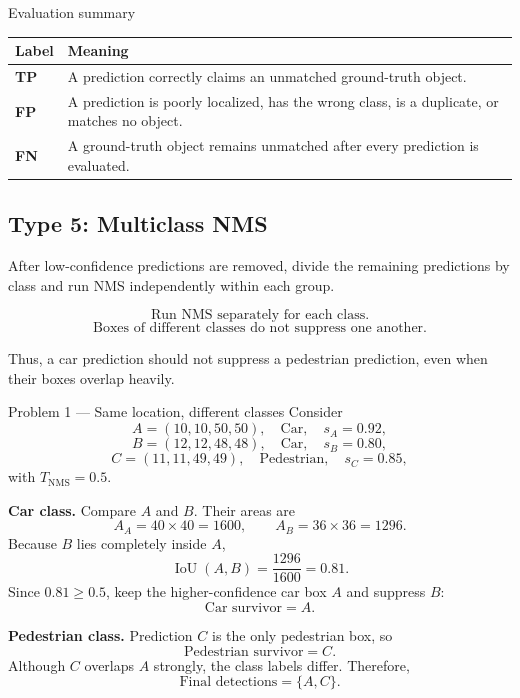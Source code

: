 \documentclass[11pt]{article}
\begin{document}
\begin{prioritybox}{Evaluation summary}
\begin{center}
\begin{tabularx}{0.9\textwidth}{>{\bfseries}p{1.6cm} X}
\toprule
Label & Meaning \\
\midrule
TP & A prediction correctly claims an unmatched ground-truth object. \\
FP & A prediction is poorly localized, has the wrong class, is a duplicate, or matches no object. \\
FN & A ground-truth object remains unmatched after every prediction is evaluated. \\
\bottomrule
\end{tabularx}
\end{center}
\end{prioritybox}

\subsection{Type 5: Multiclass NMS}

After low-confidence predictions are removed, divide the remaining predictions by class and run NMS independently within each group.

\begin{formulabox}
\[
\boxed{\text{Run NMS separately for each class.}}
\]
\[
\boxed{\text{Boxes of different classes do not suppress one another.}}
\]
\end{formulabox}

Thus, a car prediction should not suppress a pedestrian prediction, even when their boxes overlap heavily.

\begin{practicebox}{Problem 1 --- Same location, different classes}
Consider
\[
A=(10,10,50,50),\quad \text{Car},\quad s_A=0.92,
\]
\[
B=(12,12,48,48),\quad \text{Car},\quad s_B=0.80,
\]
\[
C=(11,11,49,49),\quad \text{Pedestrian},\quad s_C=0.85,
\]
with \(T_{\mathrm{NMS}}=0.5\).

\textbf{Car class.} Compare \(A\) and \(B\). Their areas are
\[
A_A=40\times40=1600,
\qquad
A_B=36\times36=1296.
\]
Because \(B\) lies completely inside \(A\),
\[
\operatorname{IoU}(A,B)=\frac{1296}{1600}=0.81.
\]
Since \(0.81\geq0.5\), keep the higher-confidence car box \(A\) and suppress \(B\):
\[
\boxed{\text{Car survivor}=A}.
\]

\textbf{Pedestrian class.} Prediction \(C\) is the only pedestrian box, so
\[
\boxed{\text{Pedestrian survivor}=C}.
\]
Although \(C\) overlaps \(A\) strongly, the class labels differ. Therefore,
\[
\boxed{\text{Final detections}=\{A,C\}}.
\]
\end{practicebox}
\end{document}
